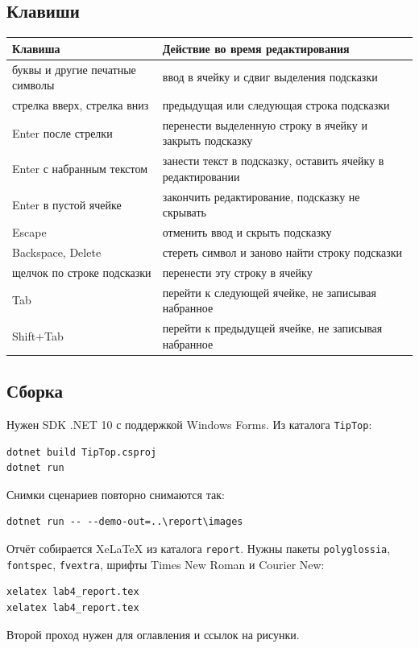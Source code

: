 \documentclass[a4paper,14pt]{extarticle}
\begin{document}
\subsection{Клавиши}
\begin{center}
\begin{tabular}{p{}p{}}
\toprule
Клавиша & Действие во время редактирования\\
\midrule
буквы и другие печатные символы & ввод в ячейку и сдвиг выделения подсказки\\
стрелка вверх, стрелка вниз & предыдущая или следующая строка подсказки\\
Enter после стрелки & перенести выделенную строку в ячейку и закрыть подсказку\\
Enter с набранным текстом & занести текст в подсказку, оставить ячейку в редактировании\\
Enter в пустой ячейке & закончить редактирование, подсказку не скрывать\\
Escape & отменить ввод и скрыть подсказку\\
Backspace, Delete & стереть символ и заново найти строку подсказки\\
щелчок по строке подсказки & перенести эту строку в ячейку\\
Tab & перейти к следующей ячейке, не записывая набранное\\
Shift+Tab & перейти к предыдущей ячейке, не записывая набранное\\
\bottomrule
\end{tabular}
\end{center}
\subsection{Сборка}
Нужен SDK .NET 10 с поддержкой Windows Forms. Из каталога \texttt{TipTop}:
\begin{Verbatim}
dotnet build TipTop.csproj
dotnet run
\end{Verbatim}
Снимки сценариев повторно снимаются так:
\begin{Verbatim}
dotnet run -- --demo-out=..\report\images
\end{Verbatim}
Отчёт собирается XeLaTeX из каталога \texttt{report}. Нужны пакеты \texttt{polyglossia}, \texttt{fontspec}, \texttt{fvextra}, шрифты Times New Roman и Courier New:
\begin{Verbatim}
xelatex lab4_report.tex
xelatex lab4_report.tex
\end{Verbatim}
Второй проход нужен для оглавления и ссылок на рисунки.
\end{document}
